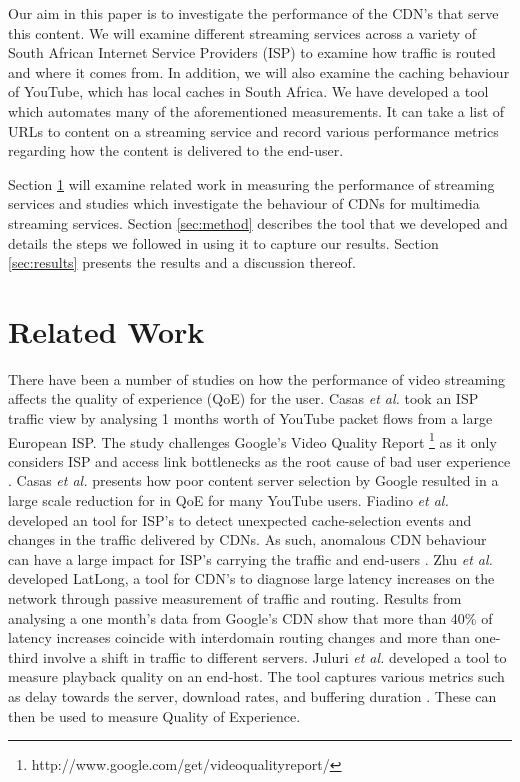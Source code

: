 \documentclass{sig-alternate-05-2015}
\begin{document}
Our aim in this paper is to investigate the performance of the CDN's that serve this content. We will examine different streaming services across a variety of South African Internet Service Providers (ISP) to examine how traffic is routed and where it comes from. In addition, we will also examine the caching behaviour of YouTube, which has local caches in South Africa. We have developed a tool which automates many of the aforementioned measurements. It can take a list of URLs to content on a streaming service and record various performance metrics regarding how the content is delivered to the end-user.

Section \ref{sec:related} will examine related work in measuring the performance of streaming services and studies which investigate the behaviour of CDNs for multimedia streaming services. Section \ref{sec:method} describes the tool that we developed and details the steps we followed in using it to capture our results. Section \ref{sec:results} presents the results and a discussion thereof.

\section{Related Work}\label{sec:related}
There have been a number of studies on how the performance of video streaming affects the quality of experience (QoE) for the user. Casas \textit{et al.} \cite{6975242} took an ISP traffic view by analysing 1 months worth of YouTube packet flows from a large European ISP. The study challenges Google's Video Quality Report \footnote{http://www.google.com/get/videoqualityreport/} as it only considers ISP and access link bottlenecks as the root cause of bad user experience \cite{6975242}. Casas \textit{et al.} \cite{6975242} presents how poor content server selection by Google resulted in a large scale reduction for in QoE for many YouTube users. Fiadino \textit{et al.} \cite{6932930} developed an tool for ISP's to detect unexpected cache-selection events and changes in the traffic delivered by CDNs. As such, anomalous CDN behaviour can have a large impact for ISP's carrying the traffic and end-users \cite{6932930, Plissonneau:2012:LVH:2155555.2155588}. Zhu \textit{et al.} \cite{6233056} developed LatLong, a tool for CDN's to diagnose large latency increases on the network through passive measurement of traffic and routing. Results from analysing a one month's data from Google's CDN show that more than 40\% of latency increases coincide with interdomain routing changes and more than one-third involve a shift in traffic to different servers. Juluri \textit{et al.} \cite{6038496} developed a tool to measure playback quality on an end-host. The tool captures various metrics such as delay towards the server, download
rates, and buffering duration \cite{6038496}. These can then be used to measure Quality of Experience.
\end{document}
